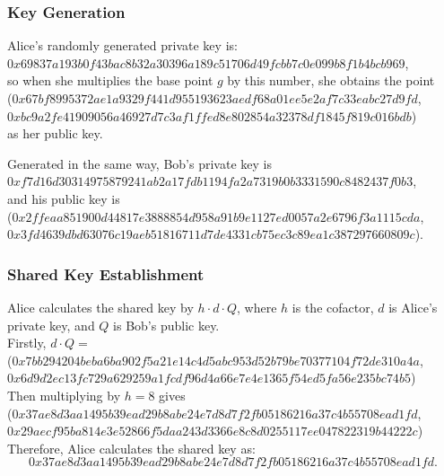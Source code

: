 \documentclass[12pt,a4paper]{article}
\begin{document}
\subsubsection{Key Generation}
Alice's randomly generated private key is: \\
{\footnotesize $0x69837a193b0f43bac8b32a30396a189c51706d49fcbb7c0e099b8f1b4bcb969$}, \\
so when she multiplies the base point $g$ by this number, she obtains the point \\
({\footnotesize $0x67bf8995372ae1a9329f441d955193623aedf68a01ee5e2af7c33eabc27d9fd$}, \\
{\footnotesize $0xbc9a2fe41909056a46927d7c3af1ffed8e802854a32378df1845f819c016bdb$}) \\
as her public key.

Generated in the same way, Bob's private key is \\
{\footnotesize $0xf7d16d30314975879241ab2a17fdb1194fa2a7319b0b3331590c8482437f0b3$}, \\
and his public key is \\
({\footnotesize $0x2ffeaa851900d44817e3888854d958a91b9e1127ed0057a2e6796f3a1115cda$}, \\
{\footnotesize $0x3fd4639dbd63076c19aeb51816711d7de4331cb75ec3c89ea1c387297660809c$}).

\subsubsection{Shared Key Establishment}
Alice calculates the shared key by $h \cdot d \cdot Q$, 
where $h$ is the cofactor, $d$ is Alice's private key, and $Q$ is Bob's public key. \\
Firstly, $d \cdot Q = $\\
({\footnotesize $0x7bb294204beba6ba902f5a21e14c4d5abc953d52b79be70377104f72de310a4a$}, \\
{\footnotesize $0x6d9d2ec13fc729a629259a1fcdf96d4a66e7e4e1365f54ed5fa56e235bc74b5$}) \\
Then multiplying by $h = 8$ gives \\
({\footnotesize $0x37ae8d3aa1495b39ead29b8abe24e7d8d7f2fb05186216a37c4b55708ead1fd$}, \\
{\footnotesize $0x29aecf95ba814e3e52866f5daa243d3366e8c8d0255117ee047822319b44222c$}) \\
Therefore, Alice calculates the shared key as: 
\begin{equation}
    0x37ae8d3aa1495b39ead29b8abe24e7d8d7f2fb05186216a37c4b55708ead1fd.
\end{equation}
\end{document}
